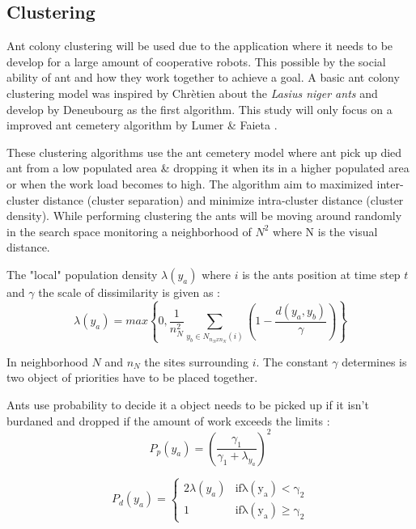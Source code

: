 \documentclass[12pt]{article}
\begin{document}
{\subsection{Clustering}
\par{Ant colony clustering will be used due to the application where it needs to be develop for a large amount of cooperative robots. This possible by the social ability of ant and how they work together to achieve a goal. A basic ant colony clustering model was inspired by Chrètien \cite{L-Chretien} about the \textit{Lasius niger ants} and develop by Deneubourg \cite{RobotAnt} as the first algorithm. This study will only focus on a improved ant cemetery algorithm by Lumer \& Faieta \cite{Lumer-Faieta}.}
\\
\par{These clustering algorithms use the ant cemetery model where ant pick up died ant from a low populated area \& dropping it when its in a higher populated area or when the work load becomes to high. The algorithm aim to maximized inter-cluster distance (cluster separation) and minimize intra-cluster distance (cluster density). While performing clustering the ants will be moving around randomly in the search space monitoring a neighborhood of \( N^2 \) where N is the visual distance.}
\\
\par{The "local" population density \( \lambda(y_{a}) \) where \( i \) is the ants position at time step \( t \) and \( \gamma \) the scale of dissimilarity is given as \cite{Lumer-Faieta}:}
\[ \lambda(y_{a}) = max \left\{ 0, \frac{1}{n^2_{N}} \sum_{y_{b} \in N_{n_{N} x n_{N}}\left( i \right) } \left( 1 - \frac{d \left( y_{a}, y_{b} \right)}{\gamma} \right) \right\} \]
\par{In neighborhood \( N \) and \( n_{N} \) the sites surrounding \( i \). The constant \( \gamma \) determines is two object of priorities have to be placed together.}
\\
\par{Ants use probability to decide it a object needs to be picked up if it isn't burdaned and dropped if the amount of work exceeds the limits \cite{Lumer-Faieta}:}
\[ P_{p} \left( y_{a} \right) = \left( \frac{\gamma_{1}}{\gamma_{1} + \lambda_{y_{a}}} \right)^2 \] 

\[ P_{d} \left( y_{a} \right) = \begin{cases} 2 \lambda \left( y_{a} \right) & \mathrm{if \lambda \left( y_{a} \right) < \gamma _{2} }\\ 1 & \mathrm{if \lambda \left( y_{a} \right) \geq \gamma_{2}} \end{cases} \]

}
\end{document}
